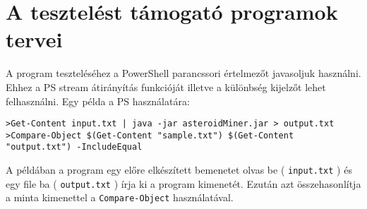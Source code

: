 \documentclass[../../projlab]{subfiles}
\begin{document}
\section{A tesztelést támogató programok tervei}
A program teszteléséhez a PowerShell parancssori értelmezőt javasoljuk használni.
Ehhez a PS stream átirányítás funkcióját illetve a különbség kijelzőt lehet felhasználni.
Egy példa a PS használatára:

\begin{adjustwidth}{-30pt}{0pt}
\begin{verbatim}
>Get-Content input.txt | java -jar asteroidMiner.jar > output.txt
>Compare-Object $(Get-Content "sample.txt") $(Get-Content "output.txt") -IncludeEqual
\end{verbatim}
\end{adjustwidth}

A példában a program egy előre elkészített bemenetet olvas be ( \verb"input.txt" )
és egy file ba ( \verb"output.txt" ) írja ki a program kimenetét.
Ezután azt összehasonlítja a minta kimenettel a \verb"Compare-Object" használatával.
\end{document}
